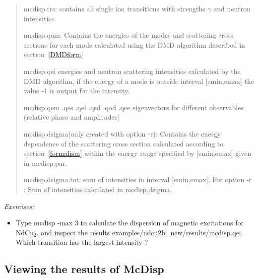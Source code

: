 \begin{quote}
\item[{\prg mcdisp.trs}:] contains all single ion transitions with strengths $\gamma$ 
and neutron intensities.
\item [{\prg mcdisp.qom}:] Contains the energies of the modes and scattering cross sections  for each mode 
calculated using the DMD algorithm described in section~\ref{DMDform}
\item[{\prg mcdisp.qei}] energies and neutron scattering intensities calculated by the DMD algorithm, if 
        the energy of a mode is outside interval  [emin,emax] the value -1 is output for the intensity.
\item[{\prg mcdisp.qem .qes .qel .qsd .qod .qee}] eigenvectors for different observables (relative phase and amplitudes)
\item [{\prg mcdisp.dsigma}(only created with option {\prg -r}):] Contains the energy dependence of the scattering cross %
section
calculated according to section~\ref{formalism} within the energy range specified by [emin,emax] given in {\prg %
mcdisp.par}. 
\item [{\prg mcdisp.dsigma.tot}:] sum of intensities in interval  [emin,emax].  For option {\prg -r} : Sum of intensities calculated in {\prg %
mcdisp.dsigma}.
\end{quote}

\vspace{1cm}
{\em Exercises:}
\begin{itemize}
\item Type {\prg mcdisp -max 3} to
calculate the dispersion of magnetic excitations for NdCu$_2$.
and inspect the results
{\prg examples/ndcu2b\_new/results/mcdisp.qei}.
Which  transition has the largest intensity ?
\end{itemize}

\subsection{Viewing the results of McDisp}

